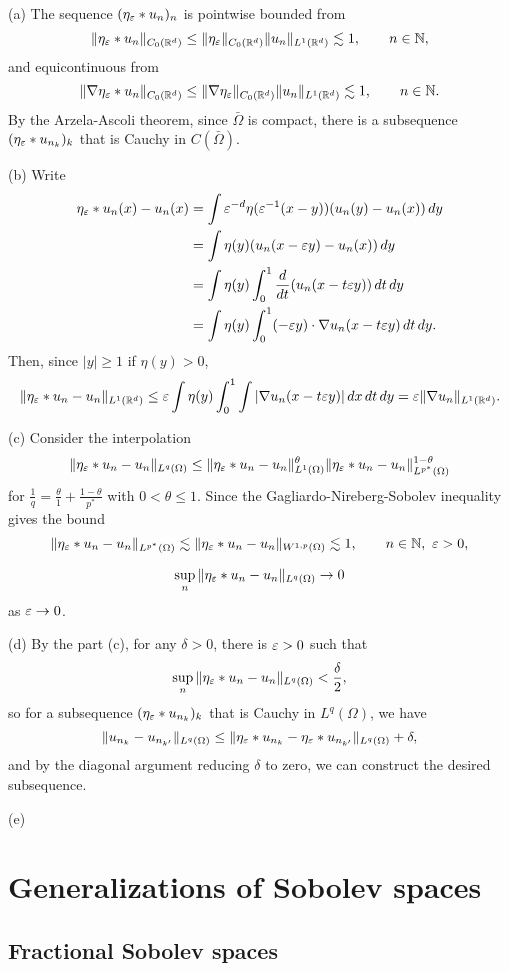 \documentclass{../../large}
\begin{document}
\begin{pf}
(a)
The sequence $(\eta_\varepsilon*u_n)_n$ is pointwise bounded from
\[\|\eta_\varepsilon*u_n\|_{C_0(\mathbb{R}^d)}\le\|\eta_\varepsilon\|_{C_0(\mathbb{R}^d)}\|u_n\|_{L^1(\mathbb{R}^d)}\lesssim1,\qquad n\in\mathbb{N},\]
and equicontinuous from
\[\|\nabla\eta_\varepsilon*u_n\|_{C_0(\mathbb{R}^d)}\le\|\nabla\eta_\varepsilon\|_{C_0(\mathbb{R}^d)}\|u_n\|_{L^1(\mathbb{R}^d)}\lesssim1,\qquad n\in\mathbb{N}.\]
By the Arzela-Ascoli theorem, since $\bar\Omega$ is compact, there is a subsequence $(\eta_\varepsilon*u_{n_k})_k$ that is Cauchy in $C(\bar\Omega)$.

(b)
Write
\begin{align*}
\eta_\e*u_n(x)-u_n(x)
&=\int\e^{-d}\eta(\e^{-1}(x-y))(u_n(y)-u_n(x))\,dy\\
&=\int\eta(y)(u_n(x-\e y)-u_n(x))\,dy\\
&=\int\eta(y)\int_0^1\dd{t}(u_n(x-t\e y))\,dt\,dy\\
&=\int\eta(y)\int_0^1(-\e y)\cdot\nabla u_n(x-t\e y)\,dt\,dy.
\end{align*}
Then, since $|y|\ge1$ if $\eta(y)>0$,
\[\|\eta_\varepsilon*u_n-u_n\|_{L^1(\mathbb{R}^d)}\le\varepsilon\int\eta(y)\int_0^1\int|\nabla u_n(x-t\varepsilon y)|\,dx\,dt\,dy=\varepsilon\|\nabla u_n\|_{L^1(\mathbb{R}^d)}.\]

(c)
Consider the interpolation
\[\|\eta_\varepsilon*u_n-u_n\|_{L^q(\Omega)}\le\|\eta_\varepsilon*u_n-u_n\|_{L^1(\Omega)}^\theta\|\eta_\varepsilon*u_n-u_n\|_{L^{p^*}(\Omega)}^{1-\theta}\]
for $\frac1q=\frac\theta1+\frac{1-\theta}{p^*}$ with $0<\theta\le1$.
Since the Gagliardo-Nireberg-Sobolev inequality gives the bound
\[\|\eta_\varepsilon*u_n-u_n\|_{L^{p^*}(\Omega)}\lesssim\|\eta_\varepsilon*u_n-u_n\|_{W^{1,p}(\Omega)}\lesssim1,\qquad n\in\mathbb{N},\ \varepsilon>0,\]

\[\sup_n\|\eta_\varepsilon*u_n-u_n\|_{L^q(\Omega)}\to0\]
as $\varepsilon\to0$.

(d)
By the part (c), for any $\delta>0$, there is $\varepsilon>0$ such that
\[\sup_n\|\eta_\varepsilon*u_n-u_n\|_{L^q(\Omega)}<\frac\delta2,\]
so for a subsequence $(\eta_\varepsilon*u_{n_k})_k$ that is Cauchy in $L^q(\Omega)$, we have
\[\|u_{n_k}-u_{n_{k'}}\|_{L^q(\Omega)}\le\|\eta_\varepsilon*u_{n_k}-\eta_\varepsilon*u_{n_{k'}}\|_{L^q(\Omega)}+\delta,\]
and by the diagonal argument reducing $\delta$ to zero, we can construct the desired subsequence.

(e)
\end{pf}




\chapter{Generalizations of Sobolev spaces}
\section{Fractional Sobolev spaces}
\end{document}
